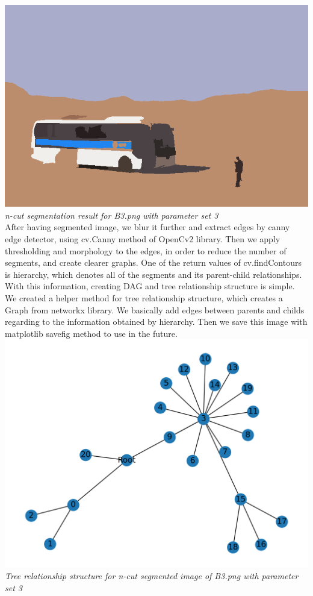 \documentclass[conference]{IEEEtran}
\begin{document}
\includegraphics[width=0.9\linewidth]{segment.png}
\\
\textit{n-cut segmentation result for B3.png with parameter set 3}\\

After having segmented image, we blur it further and extract edges by canny edge detector, using cv.Canny method of OpenCv2 library. Then we apply thresholding and morphology to the edges, in order to reduce the number of segments, and create clearer graphs. One of the return values of cv.findContours is hierarchy, which denotes all of the segments and its parent-child relationships. With this information, creating DAG and tree relationship structure is simple.\\

We created a helper method for tree relationship structure, which creates a Graph from networkx library. We basically add edges between parents and childs regarding to the information obtained by hierarchy. Then we save this image with matplotlib savefig method to use in the future.\\

\includegraphics[width=0.9\linewidth]{tree.png}
\\
\textit{Tree relationship structure for n-cut segmented image of B3.png with parameter set 3}\\
\end{document}
